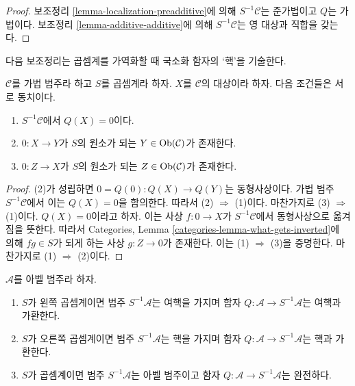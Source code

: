 \begin{proof}
보조정리 \ref{lemma-localization-preadditive}에 의해
$S^{-1}\mathcal{C}$는 준가법이고 $Q$는 가법이다.
보조정리 \ref{lemma-additive-additive}에 의해
$S^{-1}\mathcal{C}$는 영 대상과 직합을 갖는다.
\end{proof}

\noindent
다음 보조정리는 곱셈계를 가역화할 때 국소화 함자의 ‘핵’을 기술한다.

\begin{lemma}
\label{lemma-kernel-localization}
$\mathcal{C}$를 가법 범주라 하고 $S$를 곱셈계라 하자.
$X$를 $\mathcal{C}$의 대상이라 하자. 다음 조건들은 서로 동치이다.
\begin{enumerate}
\item $S^{-1}\mathcal{C}$에서 $Q(X) = 0$이다.
\item $0 : X \to Y$가 $S$의 원소가 되는
$Y \in \mathop{\mathrm{Ob}}\nolimits(\mathcal{C})$가 존재한다.
\item $0 : Z \to X$가 $S$의 원소가 되는
$Z \in \mathop{\mathrm{Ob}}\nolimits(\mathcal{C})$가 존재한다.
\end{enumerate}
\end{lemma}

\begin{proof}
(2)가 성립하면 $0 = Q(0) : Q(X) \to Q(Y)$는 동형사상이다.
가법 범주 $S^{-1}\mathcal{C}$에서 이는 $Q(X) = 0$을 함의한다.
따라서 (2) $\Rightarrow$ (1)이다. 마찬가지로 (3) $\Rightarrow$
(1)이다. $Q(X) = 0$이라고 하자. 이는 사상 $f : 0 \to X$가
$S^{-1}\mathcal{C}$에서 동형사상으로 옮겨짐을 뜻한다. 따라서
Categories, Lemma \ref{categories-lemma-what-gets-inverted}에 의해
$fg \in S$가 되게 하는 사상 $g : Z \to 0$가 존재한다.
이는 (1) $\Rightarrow$ (3)을 증명한다. 마찬가지로
(1) $\Rightarrow$ (2)이다.
\end{proof}

\begin{lemma}
\label{lemma-localization-abelian}
$\mathcal{A}$를 아벨 범주라 하자.
\begin{enumerate}
\item $S$가 왼쪽 곱셈계이면 범주 $S^{-1}\mathcal{A}$는 여핵을 가지며
함자 $Q : \mathcal{A} \to S^{-1}\mathcal{A}$는 여핵과 가환한다.
\item $S$가 오른쪽 곱셈계이면 범주 $S^{-1}\mathcal{A}$는 핵을 가지며
함자 $Q : \mathcal{A} \to S^{-1}\mathcal{A}$는 핵과 가환한다.
\item $S$가 곱셈계이면 범주 $S^{-1}\mathcal{A}$는 아벨 범주이고
함자 $Q : \mathcal{A} \to S^{-1}\mathcal{A}$는 완전하다.
\end{enumerate}
\end{lemma}

